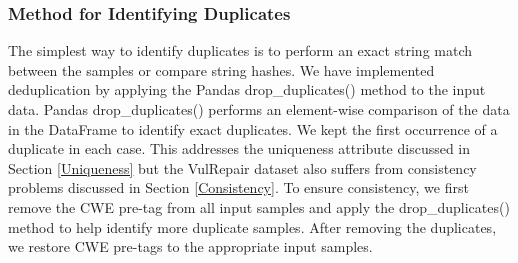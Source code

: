 \subsubsection{Method for Identifying Duplicates}
The simplest way to identify  duplicates is to perform an exact string match between the samples or compare string hashes.
We have implemented deduplication by applying the Pandas drop\_duplicates() method to the input data.
Pandas drop\_duplicates() performs an element-wise comparison of the data in the DataFrame to identify exact duplicates.
We kept the first occurrence of a duplicate in each case.
This addresses the uniqueness attribute discussed in Section \ref{Uniqueness} but the VulRepair dataset also suffers from consistency problems discussed in Section \ref{Consistency}.
To ensure consistency, we first remove the CWE pre-tag from all input samples and apply the drop\_duplicates() method to help identify more duplicate samples.
After removing the duplicates, we restore CWE pre-tags to the appropriate input samples.

